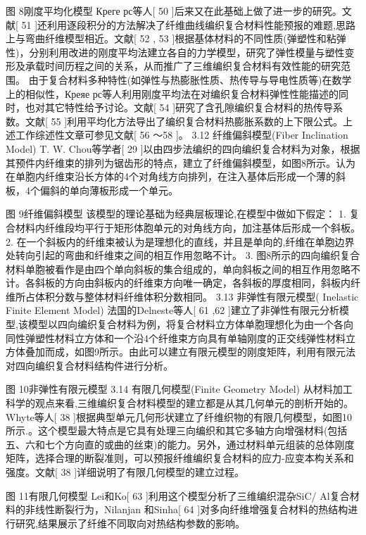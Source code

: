 图 8刚度平均化模型
Креге рс等人[ 50 ]后来又在此基础上做了进一步的研究。文献[ 51 ]还利用逐段积分的方法解决了纤维曲线编织复合材料性能预报的难题,思路上与弯曲纤维模型相近。文献[ 52 , 53 ]根据基体材料的不同性质(弹塑性和粘弹性)，分别利用改进的刚度平均法建立各自的力学模型，研究了弹性模量与塑性变形及承载时间历程之间的关系，从而推广了三维编织复合材料有效性能的研究范围。
由于复合材料多种特性(如弹性与热膨胀性质、热传导与导电性质等)在数学上的相似性，Креяе рс等人利用刚度平均法在对编织复合材料弹性性能描述的同时，也对其它特性给予讨论。文献[ 54 ]研究了含孔隙编织复合材料的热传导系数。文献[ 55 ]利用平均化方法导出了编织复合材料热膨胀系数的上下限公式。上述工作综述性文章可参见文献[ 56 ～58 ]。
3.12  纤维偏斜模型(Fiber Inclination Model)
T. W. Chou等学者[ 29 ]以由四步法编织的四向编织复合材料为对象，根据其预件内纤维束的排列为锯齿形的特点，建立了纤维偏斜模型，如图8所示。认为在单胞内纤维束沿长方体的4个对角线方向排列，在注入基体后形成一个薄的斜板，4个偏斜的单向薄板形成一个单元。
 
图 9纤维偏斜模型
该模型的理论基础为经典层板理论,在模型中做如下假定：
1.	复合材料内纤维段均平行于矩形体胞单元的对角线方向，加注基体后形成一个斜板。
2.	在一个斜板内的纤维束被认为是理想化的直线，并且是单向的,纤维在单胞边界处转向引起的弯曲和纤维束之间的相互作用忽略不计。
3.	图8所示的四向编织复合材料单胞被看作是由四个单向斜板的集合组成的，单向斜板之间的相互作用忽略不计。各斜板的方向由斜板内的纤维束方向唯一确定，各斜板的厚度相同，斜板内纤维所占体积分数与整体材料纤维体积分数相同。
3.13  非弹性有限元模型( Inelastic Finite Element Model)
法国的Delneste等人[ 61 ,62 ]建立了非弹性有限元分析模型,该模型以四向编织复合材料为例，将复合材料立方体单胞理想化为由一个各向同性弹塑性材料立方体和一个沿4个纤维束方向具有单轴刚度的正交线弹性材料立方体叠加而成，如图9所示。由此可以建立有限元模型的刚度矩阵，利用有限元法对四向编织复合材料结构件进行分析。
 
图 10非弹性有限元模型
3.14  有限几何模型(Finite Geometry Model)
从材料加工科学的观点来看,三维编织复合材料模型的建立都是从其几何单元的剖析开始的。Whyte等人[ 38 ]根据典型单元几何形状建立了纤维织物的有限几何模型，如图10所示.。这个模型最大特点是它具有处理三向编织和其它多轴方向增强材料(包括五、六和七个方向直的或曲的丝束)的能力。另外，通过材料单元组装的总体刚度矩阵，选择合理的断裂准则，可以预报纤维编织复合材料的应力-应变本构关系和强度。文献[ 38 ]详细说明了有限几何模型的建立过程。
 
图 11有限几何模型
Lei和Ko[ 63 ]利用这个模型分析了三维编织混杂SiC/ Al复合材料的非线性断裂行为，Nilanjan 和Sinha[ 64 ]对多向纤维增强复合材料的热结构进行研究,结果展示了纤维不同取向对热结构参数的影响。




